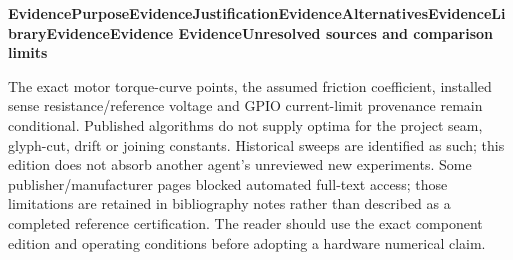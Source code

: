 \documentclass[11pt,a4paper,oneside]{report}
\newcommand{\Q}[2]{\par\addvspace{7pt}\begingroup\sffamily\bfseries\small
\def\qt{#1}\def\pp{Purpose}\def\jj{Justification}\def\aa{Alternatives}\def\ll{Library}\def\ee{Evidence}
\ifx\qt\pp\color{purpose}\else\ifx\qt\jj\color{reason}\else\ifx\qt\aa\color{alternative}\else\ifx\qt\ll\color{library}\else\ifx\qt\ee\color{source}\else\color{method}\fi\fi\fi\fi\fi
#1\enspace\textbar\enspace #2\par\endgroup\nobreak\smallskip}
\begin{document}
\Q{Evidence}{Unresolved sources and comparison limits}
The exact motor torque-curve points, the assumed friction coefficient, installed
sense resistance/reference voltage and GPIO current-limit provenance remain
conditional. Published algorithms do not supply optima for the project seam,
glyph-cut, drift or joining constants. Historical sweeps are identified as such;
this edition does not absorb another agent's unreviewed new experiments.
Some publisher/manufacturer pages blocked automated full-text access; those
limitations are retained in bibliography notes rather than described as a
completed reference certification. The reader should use the exact component
edition and operating conditions before adopting a hardware numerical claim.


\end{document}
